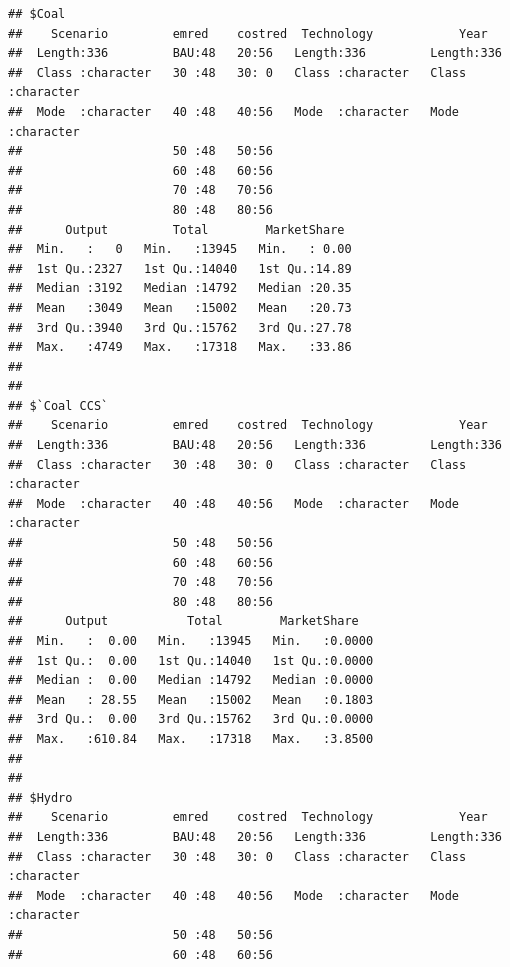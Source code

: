 \documentclass[]{article}
\begin{document}
\begin{verbatim}
## $Coal
##    Scenario         emred    costred  Technology            Year          
##  Length:336         BAU:48   20:56   Length:336         Length:336        
##  Class :character   30 :48   30: 0   Class :character   Class :character  
##  Mode  :character   40 :48   40:56   Mode  :character   Mode  :character  
##                     50 :48   50:56                                        
##                     60 :48   60:56                                        
##                     70 :48   70:56                                        
##                     80 :48   80:56                                        
##      Output         Total        MarketShare   
##  Min.   :   0   Min.   :13945   Min.   : 0.00  
##  1st Qu.:2327   1st Qu.:14040   1st Qu.:14.89  
##  Median :3192   Median :14792   Median :20.35  
##  Mean   :3049   Mean   :15002   Mean   :20.73  
##  3rd Qu.:3940   3rd Qu.:15762   3rd Qu.:27.78  
##  Max.   :4749   Max.   :17318   Max.   :33.86  
##                                                
## 
## $`Coal CCS`
##    Scenario         emred    costred  Technology            Year          
##  Length:336         BAU:48   20:56   Length:336         Length:336        
##  Class :character   30 :48   30: 0   Class :character   Class :character  
##  Mode  :character   40 :48   40:56   Mode  :character   Mode  :character  
##                     50 :48   50:56                                        
##                     60 :48   60:56                                        
##                     70 :48   70:56                                        
##                     80 :48   80:56                                        
##      Output           Total        MarketShare    
##  Min.   :  0.00   Min.   :13945   Min.   :0.0000  
##  1st Qu.:  0.00   1st Qu.:14040   1st Qu.:0.0000  
##  Median :  0.00   Median :14792   Median :0.0000  
##  Mean   : 28.55   Mean   :15002   Mean   :0.1803  
##  3rd Qu.:  0.00   3rd Qu.:15762   3rd Qu.:0.0000  
##  Max.   :610.84   Max.   :17318   Max.   :3.8500  
##                                                   
## 
## $Hydro
##    Scenario         emred    costred  Technology            Year          
##  Length:336         BAU:48   20:56   Length:336         Length:336        
##  Class :character   30 :48   30: 0   Class :character   Class :character  
##  Mode  :character   40 :48   40:56   Mode  :character   Mode  :character  
##                     50 :48   50:56                                        
##                     60 :48   60:56                                        

\end{verbatim}
\end{document}

